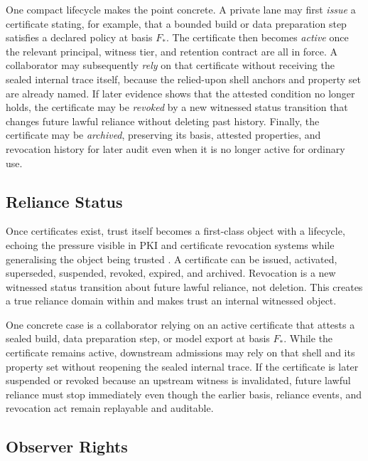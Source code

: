 \documentclass{aion}
\begin{document}
One compact lifecycle makes the point concrete. A private lane may first
\emph{issue} a certificate stating, for example, that a bounded build or data
preparation step satisfies a declared policy at basis \(F_*\). The certificate
then becomes \emph{active} once the relevant principal, witness tier, and
retention contract are all in force. A collaborator may subsequently
\emph{rely} on that certificate without receiving the sealed internal trace
itself, because the relied-upon shell anchors and property set are already
named. If later evidence shows that the attested condition no longer holds, the
certificate may be \emph{revoked} by a new witnessed status transition that
changes future lawful reliance without deleting past history. Finally, the
certificate may be \emph{archived}, preserving its basis, attested properties,
and revocation history for later audit even when it is no longer active for
ordinary use.

\subsection{Reliance Status}

Once certificates exist, trust itself becomes a first-class object with a
lifecycle, echoing the pressure visible in PKI and certificate revocation
systems while generalising the object being trusted \cite{RFC5280}. A
certificate can be issued, activated, superseded, suspended, revoked, expired,
and archived. Revocation is a new witnessed status transition about future
lawful reliance, not deletion. This creates a true reliance domain
within \WARP{} and makes trust an internal witnessed object.

One concrete case is a collaborator relying on an active certificate that
attests a sealed build, data preparation step, or model export at basis
\(F_*\). While the certificate remains active, downstream admissions may rely
on that shell and its property set without reopening the sealed internal trace.
If the certificate is later suspended or revoked because an upstream witness is
invalidated, future lawful reliance must stop immediately even though the
earlier basis, reliance events, and revocation act remain replayable and
auditable.

\subsection{Observer Rights}
\end{document}
